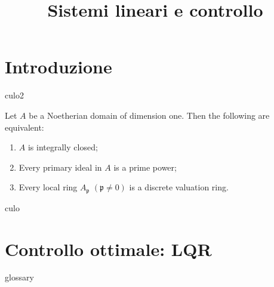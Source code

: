 \title{Sistemi lineari e controllo}
\maketitle
\label{sec:linear-systems-and-control}



\section{Introduzione}

culo2
\begin{thm}
    \label{thm:dedekind}
    Let \( A \) be a Noetherian domain of dimension one. Then the following are equivalent:
    \begin{enumerate}
        \item
        \( A \) is integrally closed;

        \item
        Every primary ideal in \( A \) is a prime power;

        \item
        Every local ring \( A_\mathfrak{p} \) \( (\mathfrak{p} \neq 0) \) is a discrete valuation ring.
    \end{enumerate}
\end{thm}

culo

\section{Controllo ottimale: LQR} \todo glossary